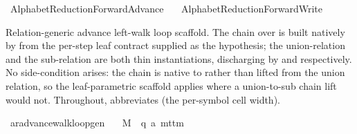 %
\begin{isabellebody}%
%
%
\isadelimtheory
%
\endisadelimtheory
%
\isatagtheory
{}\isamarkupfalse%
\ AlphabetReduction{\isacharunderscore}{\kern0pt}ForwardAdvance\isanewline
\ \ \ AlphabetReduction{\isacharunderscore}{\kern0pt}ForwardWrite\isanewline
{}%
\endisatagtheory
{\isafoldtheory}%
%
\isadelimtheory
%
\endisadelimtheory
%
\isadelimdocument
%
\endisadelimdocument
%
\isatagdocument
%
\isamarkuptrue%
%
\endisatagdocument
{\isafolddocument}%
%
\isadelimdocument
%
\endisadelimdocument
%
\begin{isamarkuptext}%
Relation-generic advance left-walk loop scaffold.  The
  chain over  is built natively by
   from the per-step leaf contract
  supplied as the  hypothesis; the union-relation
   and the sub-relation
   are both thin instantiations,
  discharging  by  and
   respectively.  No
   side-condition arises: the chain is native to
   rather than lifted from the union relation, so the
  leaf-parametric scaffold applies
  where a union-to-sub chain lift would not.
  Throughout,  abbreviates  (the per-symbol cell width).%
\end{isamarkuptext}\isamarkuptrue%
\isamarkupfalse%
\ ar{\isacharunderscore}{\kern0pt}advance{\isacharunderscore}{\kern0pt}walk{\isacharunderscore}{\kern0pt}loop{\isacharunderscore}{\kern0pt}gen{\isacharcolon}{\kern0pt}\isanewline
\ \ \ M\ {\isacharcolon}{\kern0pt}{\isacharcolon}{\kern0pt}\ {\isachardoublequoteopen}{\isacharparenleft}{\kern0pt}{\isacharprime}{\kern0pt}q{\isacharcomma}{\kern0pt}\ {\isacharprime}{\kern0pt}a{\isacharparenright}{\kern0pt}\ mttm{\isachardoublequoteclose}\isanewline

\end{isabellebody}
